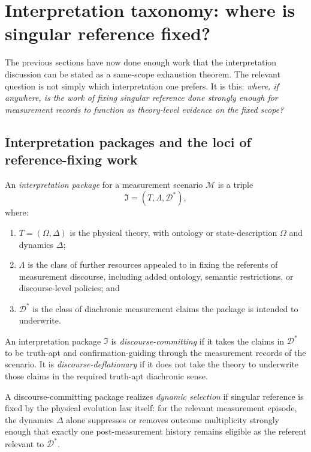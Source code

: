 \section{Interpretation taxonomy: where is singular reference fixed?}
\label{sec:taxonomy}

The previous sections have now done enough work that the interpretation discussion can be stated as a
same-scope exhaustion theorem. The relevant question is not simply which interpretation one prefers.
It is this: \emph{where, if anywhere, is the work of fixing singular reference done strongly enough for
measurement records to function as theory-level evidence on the fixed scope?}

\subsection{Interpretation packages and the loci of reference-fixing work}

\begin{definition}
An \emph{interpretation package} for a measurement scenario $\mathcal{M}$ is a triple
\[
\mathfrak{I}=(T,\Lambda,\mathcal{D}^*),
\]
where:
\begin{enumerate}
    \item $T=(\Omega,\Delta)$ is the physical theory, with ontology or state-description $\Omega$ and
    dynamics $\Delta$;
    \item $\Lambda$ is the class of further resources appealed to in fixing the referents of measurement
    discourse, including added ontology, semantic restrictions, or discourse-level policies; and
    \item $\mathcal{D}^*$ is the class of diachronic measurement claims the package is intended to
    underwrite.
\end{enumerate}
\end{definition}

\begin{definition}
An interpretation package $\mathfrak{I}$ is \emph{discourse-committing} if it takes the claims in
$\mathcal{D}^*$ to be truth-apt and confirmation-guiding through the measurement records of the
scenario. It is \emph{discourse-deflationary} if it does not take the theory to underwrite those claims in
the required truth-apt diachronic sense.
\end{definition}

\begin{definition}
A discourse-committing package realizes \emph{dynamic selection} if singular reference is fixed by the
physical evolution law itself: for the relevant measurement episode, the dynamics $\Delta$ alone
suppresses or removes outcome multiplicity strongly enough that exactly one post-measurement history
remains eligible as the referent relevant to $\mathcal{D}^*$.
\end{definition}

